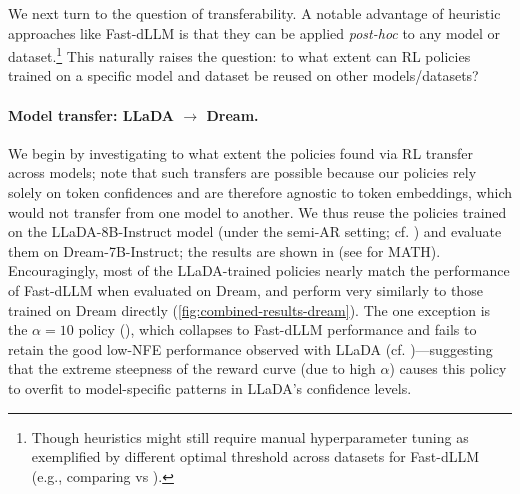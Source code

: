 We next turn to the question of transferability. A notable advantage of heuristic approaches like Fast-dLLM is that they can be applied \emph{post-hoc} to any model or dataset.\footnote{Though heuristics might still require manual hyperparameter tuning as exemplified by different optimal threshold across datasets for Fast-dLLM (e.g., comparing  vs ).} This naturally raises the question: to what extent can RL policies trained on a specific model and dataset be reused on other models/datasets?

\paragraph{Model transfer: LLaDA $\rightarrow$ Dream.}
We begin by investigating to what extent the policies found via RL transfer across models;
note that such transfers are possible because our policies rely solely on token confidences and are therefore agnostic to token embeddings, which would not transfer from one model to another.
We thus reuse the policies trained on the LLaDA-8B-Instruct model (under the semi-AR setting; cf. ) and evaluate them on Dream-7B-Instruct; the results are shown in  (see  for MATH). 
Encouragingly, most of the LLaDA-trained policies nearly match the performance of Fast-dLLM when evaluated on Dream, and perform very similarly to those trained on Dream directly (\autoref{fig:combined-results-dream}). The one exception is the $\alpha = 10$ policy (\protect\scalerel*{\usebox{\boxgreen}}{\square}), which collapses to Fast-dLLM performance and fails to retain the good low-NFE performance observed with LLaDA (cf. )—suggesting that the extreme steepness of the reward curve (due to high $\alpha$) causes this policy to overfit to model-specific patterns in LLaDA's confidence levels. %

